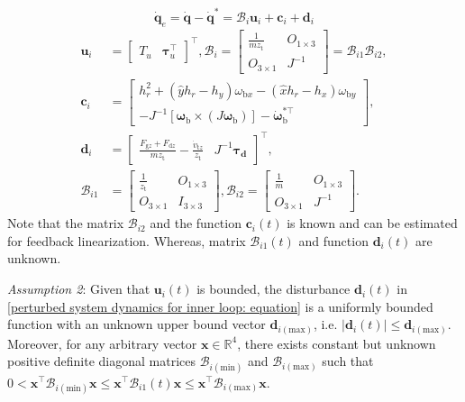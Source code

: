 \documentclass[lettersize,journal]{IEEEtran}
\begin{document}
\begin{equation} \label{perturbed system dynamics for inner loop: equation}
    \dot{\boldsymbol{q}}_{e} = \dot{\boldsymbol{q}} - \dot{\boldsymbol{q}}^* = \mathcal{B}_i \boldsymbol{u}_i + \boldsymbol{c}_i + \boldsymbol{d}_i
\end{equation}
\begin{align*}
    \boldsymbol{u}_i &= \begin{bmatrix} T_{u} & \boldsymbol{\tau}_{u}^{\top} \end{bmatrix}^{\top}, 
    \mathcal{B}_i = \begin{bmatrix} \frac{1}{m z_{\text{t}}} & O_{1 \times 3} \\ O_{3 \times 1} & J^{-1} \end{bmatrix} = \mathcal{B}_{i 1} \mathcal{B}_{i 2}, \\
    \boldsymbol{c}_i &= \begin{bmatrix} h_r^2 + \left( \hat{y} h_r - h_y \right) \omega_{\text{b}x} - \left( \hat{x} h_r - h_x \right) \omega_{\text{b}y} \\ - J^{-1} \left[ \boldsymbol{\omega}_{\text{b}} \times (J \boldsymbol{\omega}_{\text{b}}) \right] - \dot{\boldsymbol{\omega}}_{\text{b}}^{*\top} \end{bmatrix}, \\
    \boldsymbol{d}_i &= \begin{bmatrix} \frac{F_{\text{g}z} + F_{\text{d}z}}{m z_{\text{t}}} - \frac{\dot{v}_{\text{t}z}}{z_{\text{t}}} & J^{-1} \boldsymbol{\tau_{\text{d}}} \end{bmatrix}^{\top}, \\
    \mathcal{B}_{i 1} &= \begin{bmatrix} \frac{1}{z_{\text{t}}} & O_{1 \times 3} \\ O_{3 \times 1} & I_{3 \times 3} \end{bmatrix}, \mathcal{B}_{i 2} = \begin{bmatrix} \frac{1}{m} & O_{1 \times 3} \\ O_{3 \times 1} & J^{-1} \end{bmatrix}.
\end{align*}
Note that the matrix $\mathcal{B}_{i2}$ and the function $\boldsymbol{c}_i(t)$ is known and can be estimated for feedback linearization. Whereas, matrix $\mathcal{B}_{i1}(t)$ and function $\boldsymbol{d}_i(t)$ are unknown.

\textit{Assumption 2}: Given that $\boldsymbol{u}_i(t)$ is bounded, the disturbance $\boldsymbol{d}_i(t)$ in \eqref{perturbed system dynamics for inner loop: equation} is a uniformly bounded function with an unknown upper bound vector $\boldsymbol{d}_{i(\text{max})}$, i.e. $\lvert \boldsymbol{d}_i(t) \rvert \leq \boldsymbol{d}_{i(\text{max})}$. Moreover, for any arbitrary vector $\boldsymbol{x} \in \mathbb{R}^{4}$, there exists constant but unknown positive definite diagonal matrices $\mathcal{B}_{i (\text{min})}$ and $\mathcal{B}_{i (\text{max})}$ such that $0 < \boldsymbol{x}^{\top} \mathcal{B}_{i (\text{min})} \boldsymbol{x} \leq \boldsymbol{x}^{\top}  \mathcal{B}_{i1}(t) \boldsymbol{x} \leq \boldsymbol{x}^{\top} \mathcal{B}_{i (\text{max})} \boldsymbol{x}$.
\end{document}
